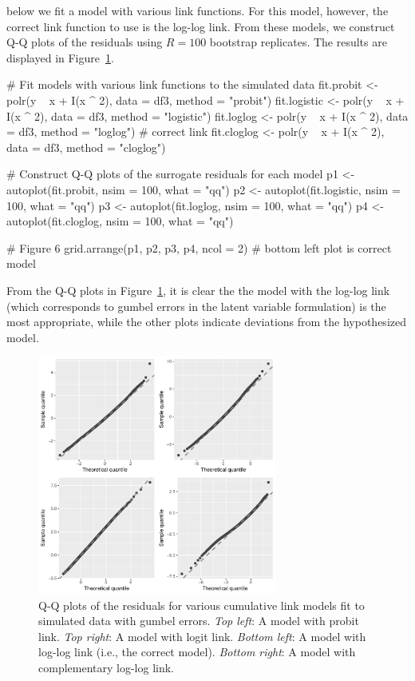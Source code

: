 below we fit a model with various link functions. For this model, however, the correct link function to use is the log-log link. From these models, we construct Q-Q plots of the residuals using $R = 100$ bootstrap replicates. The results are displayed in Figure~\ref{fig:link}.
\begin{example}
# Fit models with various link functions to the simulated data
fit.probit <- polr(y ~ x + I(x ^ 2), data = df3, method = "probit")
fit.logistic <- polr(y ~ x + I(x ^ 2), data = df3, method = "logistic")
fit.loglog <- polr(y ~ x + I(x ^ 2), data = df3, method = "loglog")  # correct link
fit.cloglog <- polr(y ~ x + I(x ^ 2), data = df3, method = "cloglog")

# Construct Q-Q plots of the surrogate residuals for each model
p1 <- autoplot(fit.probit, nsim = 100, what = "qq")
p2 <- autoplot(fit.logistic, nsim = 100, what = "qq")
p3 <- autoplot(fit.loglog, nsim = 100, what = "qq")
p4 <-  autoplot(fit.cloglog, nsim = 100, what = "qq")

# Figure 6
grid.arrange(p1, p2, p3, p4, ncol = 2)  # bottom left plot is correct model
\end{example}
From the Q-Q plots in Figure~\ref{fig:link}, it is clear the the model with the log-log link (which corresponds to gumbel errors in the latent variable formulation) is the most appropriate, while the other plots indicate deviations from the hypothesized model.

\begin{figure}[!htbp]
  \centering
  \includegraphics[width=0.7\textwidth]{link}
  \caption{Q-Q plots of the residuals for various cumulative link models fit to simulated data with gumbel errors. \textit{Top left}: A model with probit link. \textit{Top right}: A model with logit link. \textit{Bottom left}: A model with log-log link (i.e., the correct model). \textit{Bottom right}: A model with complementary log-log link.}  
  \label{fig:link}
\end{figure}

